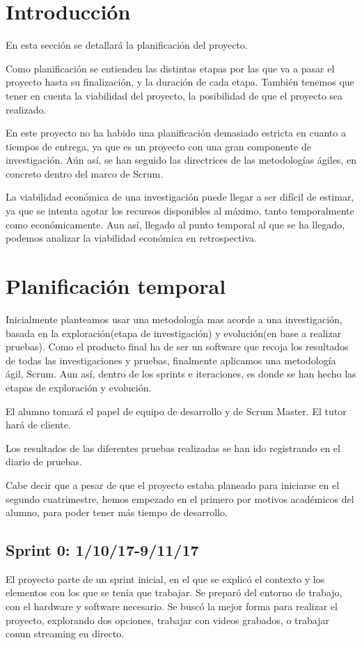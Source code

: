 
\section{Introducción}
En esta sección se detallará la planificación del proyecto. 

Como planificación se entienden las distintas etapas por las que va a pasar el proyecto hasta su finalización, y la duración de cada etapa. También tenemos que tener en cuenta la viabilidad del proyecto, la posibilidad de que el proyecto sea realizado.

En este proyecto no ha habido una planificación demasiado estricta en cuanto a tiempos de entrega, ya que es un proyecto con una gran componente de investigación. Aún así, se han seguido las directrices de las metodologías ágiles, en concreto dentro del marco de Scrum\cite{scrum}.

La viabilidad económica de una investigación puede llegar a ser difícil de estimar, ya que se intenta agotar los recursos disponibles al máximo, tanto temporalmente como económicamente. Aun así, llegado al punto temporal al que se ha llegado, podemos analizar la viabilidad económica en retrospectiva.

\section{Planificación temporal}

Inicialmente planteamos usar una metodología mas acorde a una investigación, basada en la exploración(etapa de investigación) y evolución(en base a realizar pruebas). Como el producto final ha de ser un software que recoja los resultados de todas las investigaciones y pruebas, finalmente aplicamos una metodología ágil, Scrum. Aun así, dentro de los sprints e iteraciones, es donde se han hecho las etapas de exploración y evolución. 

El alumno tomará el papel de equipo de desarrollo y de Scrum Master. El tutor hará de cliente.

Los resultados de las diferentes pruebas realizadas se han ido registrando en el diario de pruebas\cite{diario}.

Cabe decir que a pesar de que el proyecto estaba planeado para iniciarse en el segundo cuatrimestre, hemos empezado en el primero por motivos académicos del alumno, para poder tener más tiempo de desarrollo.

\subsection{Sprint 0: 1/10/17-9/11/17}
El proyecto parte de un sprint inicial, en el que se explicó el contexto y los elementos con los que se tenía que trabajar. Se preparó del entorno de trabajo, con el hardware y software necesario. Se buscó la mejor forma para realizar el proyecto, explorando dos opciones, trabajar con videos grabados, o trabajar conun streaming en directo.

